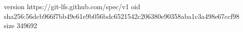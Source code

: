 version https://git-lfs.github.com/spec/v1
oid sha256:56dcb966f7bb49e61e9b056bdc6521542c206380e90358aba1c3a498e67ccf98
size 349692
